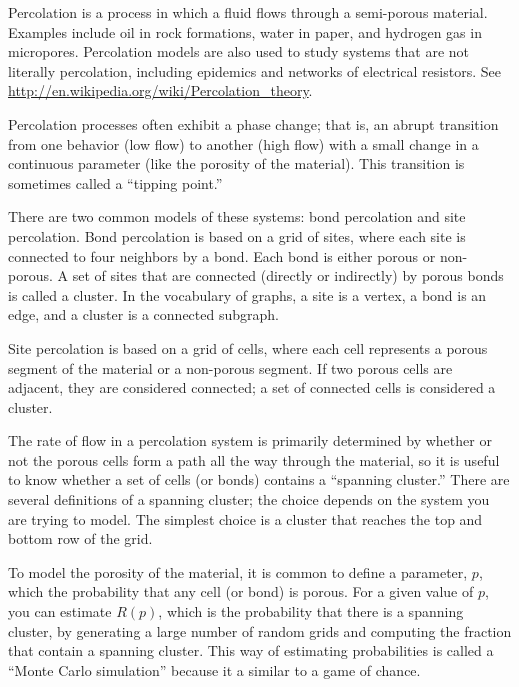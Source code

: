 \documentclass[10pt]{book}
\begin{document}
Percolation is a process in which a fluid flows through a semi-porous
material.  Examples include oil in rock formations, water in paper,
and hydrogen gas in micropores.  Percolation models are also used to
study systems that are not literally percolation, including epidemics
and networks of electrical resistors.  See
\url{http://en.wikipedia.org/wiki/Percolation_theory}.

Percolation processes often exhibit a phase change; that is, an
abrupt transition from one behavior (low flow) to another
(high flow) with a small change in a continuous parameter (like
the porosity of the material).  This transition is sometimes
called a ``tipping point.''

There are two common models of these systems: bond percolation
and site percolation.  Bond percolation is based on a grid
of sites, where each site is connected to four neighbors by
a bond.  Each bond is either porous or non-porous.  A set of sites
that are connected (directly or indirectly) by porous bonds is
called a cluster.  In the vocabulary of graphs, a site is a vertex,
a bond is an edge, and a cluster is a connected subgraph.

Site percolation is based on a grid of cells, where each cell
represents a porous segment of the material or a non-porous segment.
If two porous cells are adjacent, they are considered connected; a set
of connected cells is considered a cluster.

The rate of flow in a percolation system is primarily determined by
whether or not the porous cells form a path all the way through the
material, so it is useful to know whether a set of cells (or bonds)
contains a ``spanning cluster.''  There are several
definitions of a spanning cluster; the choice depends on the system
you are trying to model. The simplest choice is a cluster that reaches
the top and bottom row of the grid.

To model the porosity of the material, it is common to define
a parameter, $p$, which the probability that any cell (or bond)
is porous.  For a given value of $p$, you can estimate
$R(p)$, which is the probability that there is a spanning cluster,
by generating a large number of random grids and computing the
fraction that contain a spanning cluster.  This way of estimating
probabilities is called a ``Monte Carlo simulation'' because
it a similar to a game of chance.
\end{document}
